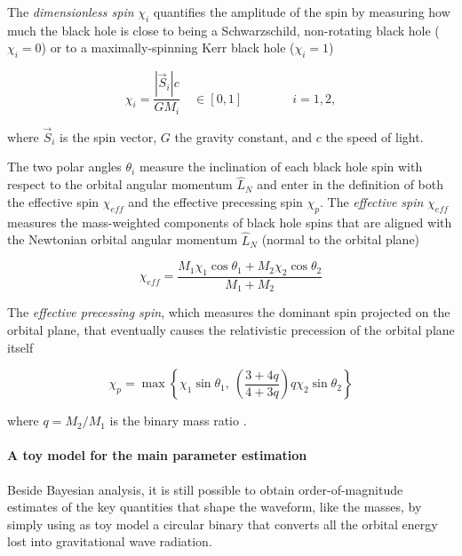 \documentclass[a4paper,titlepage]{book}     	%
\begin{document}
The \emph{dimensionless spin} $\chi_i$ quantifies the amplitude of the spin by measuring how much the black hole is close to being a Schwarzschild, non-rotating black hole ($\chi_i = 0$) or to a maximally-spinning Kerr black hole ($\chi_i = 1$)

\begin{equation}\label{eq:chispin}
	\chi_i = \frac{|\vec{S}_i| c}{G M_i} \quad  \in [0,1]   \qquad \qquad i=1,2,
\end{equation}

where $\vec{S}_i$ is the spin vector, $G$ the gravity constant, and $c$ the speed of light.

The two polar angles $\theta_i$ measure the inclination of each black hole spin with respect to the orbital angular momentum $\hat{L}_N$ and enter in the definition of both the effective spin $\chi_{eff}$ and the effective precessing spin $\chi_p$. The \emph{effective spin} $\chi_{eff}$ measures the mass-weighted components of black hole spins that are aligned with the Newtonian orbital angular momentum $\hat{L}_N$ (normal to the orbital plane)

\begin{equation}\label{eq:chieff}
	\chi_{eff} = \frac{M_1 \chi_1 \cos\theta_1 + M_2 \chi_2 \cos\theta_2}{M_1 + M_2}
\end{equation}

The \emph{effective precessing spin}, which measures the dominant spin projected on the orbital plane, that eventually causes the relativistic precession of the orbital plane itself

\begin{equation}\label{eq:chip}
	\chi_p = \max \left\{\chi_1 \sin\theta_1,~ \left(\frac{3+4q}{4+3q}\right) q\chi_2 \sin\theta_2\right\}
\end{equation}

where $q=M_2/M_1$ is the binary mass ratio \cite{GWTC-3_interpretation}.



\paragraph{A toy model for the main parameter estimation} Beside Bayesian analysis, it is still possible to obtain order-of-magnitude estimates of the key quantities that shape the waveform, like the masses, by simply using as toy model a circular binary that converts all the orbital energy lost into gravitational wave radiation. \\
\end{document}
